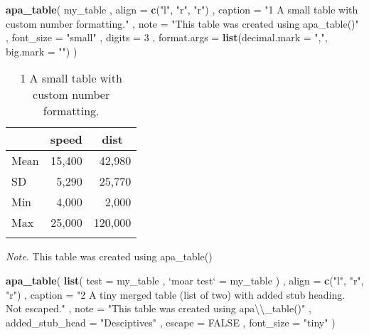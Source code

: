\documentclass[man]{apa6}
\newenvironment{Shaded}{\begin{snugshade}}{\end{snugshade}}
\newcommand{\KeywordTok}[1]{\textcolor[rgb]{0.13,0.29,0.53}{\textbf{#1}}}
\newcommand{\DataTypeTok}[1]{\textcolor[rgb]{0.13,0.29,0.53}{#1}}
\newcommand{\DecValTok}[1]{\textcolor[rgb]{0.00,0.00,0.81}{#1}}
\newcommand{\CharTok}[1]{\textcolor[rgb]{0.31,0.60,0.02}{#1}}
\newcommand{\StringTok}[1]{\textcolor[rgb]{0.31,0.60,0.02}{#1}}
\newcommand{\OtherTok}[1]{\textcolor[rgb]{0.56,0.35,0.01}{#1}}
\newcommand{\NormalTok}[1]{#1}
\begin{document}
\begin{Shaded}
\begin{Highlighting}[]
\KeywordTok{apa_table}\NormalTok{(}
\NormalTok{  my_table}
\NormalTok{  , }\DataTypeTok{align =} \KeywordTok{c}\NormalTok{(}\StringTok{"l"}\NormalTok{, }\StringTok{"r"}\NormalTok{, }\StringTok{"r"}\NormalTok{)}
\NormalTok{  , }\DataTypeTok{caption =} \StringTok{"1 A small table with custom number formatting."}
\NormalTok{  , }\DataTypeTok{note =} \StringTok{"This table was created using apa_table()"}
\NormalTok{  , }\DataTypeTok{font_size =} \StringTok{"small"}
\NormalTok{  , }\DataTypeTok{digits =} \DecValTok{3}
\NormalTok{  , }\DataTypeTok{format.args =} \KeywordTok{list}\NormalTok{(}\DataTypeTok{decimal.mark =} \StringTok{","}\NormalTok{, }\DataTypeTok{big.mark =} \StringTok{""}\NormalTok{)}
\NormalTok{)}
\end{Highlighting}
\end{Shaded}

\begin{table}[tbp]
\begin{center}
\begin{threeparttable}
\caption{\label{tab:unnamed-chunk-2}1 A small table with custom number formatting.}
\small{
\begin{tabular}{lrr}
\toprule
 & \multicolumn{1}{c}{speed} & \multicolumn{1}{c}{dist}\\
\midrule
Mean & 15,400 & 42,980\\
SD & 5,290 & 25,770\\
Min & 4,000 & 2,000\\
Max & 25,000 & 120,000\\
\bottomrule
\addlinespace
\end{tabular}
}
\begin{tablenotes}[para]
\normalsize{\textit{Note.} This table was created using apa\_table()}
\end{tablenotes}
\end{threeparttable}
\end{center}
\end{table}

\begin{Shaded}
\begin{Highlighting}[]
\KeywordTok{apa_table}\NormalTok{(}
  \KeywordTok{list}\NormalTok{(}
    \DataTypeTok{test =}\NormalTok{ my_table}
\NormalTok{    , }\StringTok{`}\DataTypeTok{moar test}\StringTok{`}\NormalTok{ =}\StringTok{ }\NormalTok{my_table}
\NormalTok{  )}
\NormalTok{  , }\DataTypeTok{align =} \KeywordTok{c}\NormalTok{(}\StringTok{"l"}\NormalTok{, }\StringTok{"r"}\NormalTok{, }\StringTok{"r"}\NormalTok{)}
\NormalTok{  , }\DataTypeTok{caption =} \StringTok{"2 A tiny merged table (list of two) with added stub heading. Not escaped."}
\NormalTok{  , }\DataTypeTok{note =} \StringTok{"This table was created using apa}\CharTok{\textbackslash{}\textbackslash{}}\StringTok{_table()"}
\NormalTok{  , }\DataTypeTok{added_stub_head =} \StringTok{"Desciptives"}
\NormalTok{  , }\DataTypeTok{escape =} \OtherTok{FALSE}
\NormalTok{  , }\DataTypeTok{font_size =} \StringTok{"tiny"}
\NormalTok{)}
\end{Highlighting}
\end{Shaded}
\end{document}
